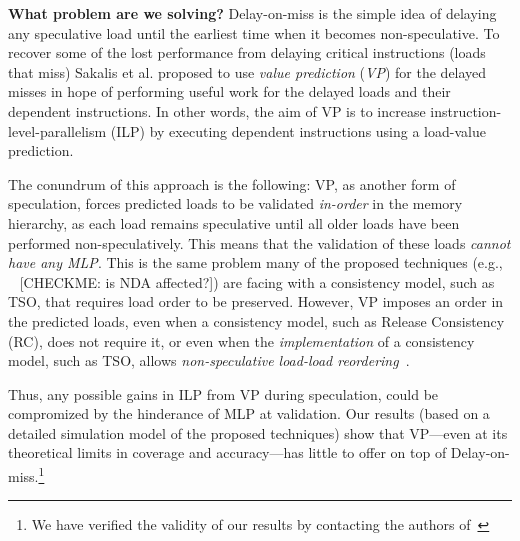 \noindent \textbf{What problem are we solving?} Delay-on-miss is the simple idea of delaying any speculative load until the earliest time when it becomes non-speculative. 
To recover some of the lost performance from delaying critical instructions (loads that miss) Sakalis et al. proposed to use \emph{value prediction} (\emph{VP}) for the delayed misses in hope of performing useful work for the delayed loads and their dependent instructions. In other words, the aim of VP is to increase instruction-level-parallelism (ILP) by executing dependent instructions using a load-value prediction. 

The conundrum of this approach is the following: VP, as another form of speculation, forces predicted loads to be validated \emph{in-order} in the memory hierarchy, as each load remains speculative until all older loads have been performed non-speculatively. This means that the validation of these loads \emph{cannot have any MLP}. 
This is the same problem many of the proposed techniques (e.g., ~\cite{yan_invisispec:MICRO2018,sakalis2019ghost,sakalis2019efficient,weisse2019nda}{\color{red} [CHECKME: is NDA affected?]}) are facing with a consistency model, such as TSO, that requires load order to be preserved. 
However, VP imposes an order in the predicted loads, even when a consistency model, such as Release Consistency (RC), does not require it, or even when the \emph{implementation} of a consistency model, such as TSO, allows \emph{non-speculative load-load reordering}~\cite{aros-isca17}.

Thus, any possible gains in ILP from VP during speculation, could be compromized by the hinderance of MLP at validation.
{\color{red} Our results (based on a detailed simulation model of the proposed techniques) show that VP---even at its theoretical limits in coverage and accuracy---has little to offer on top of Delay-on-miss.\footnote{We have verified the validity of our results by contacting the authors of~\cite{sakalis2019efficient}}}

